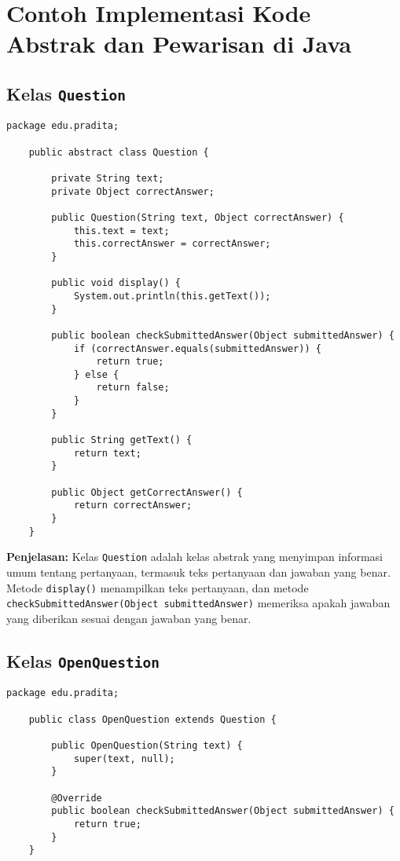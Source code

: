 \section{Contoh Implementasi Kode Abstrak dan Pewarisan di Java}

\subsection{Kelas \texttt{Question}}

\begin{lstlisting}[style=JavaStyle]
	package edu.pradita;
	
	public abstract class Question {
		
		private String text;
		private Object correctAnswer;
		
		public Question(String text, Object correctAnswer) {
			this.text = text;
			this.correctAnswer = correctAnswer;
		}
		
		public void display() {
			System.out.println(this.getText());
		}
		
		public boolean checkSubmittedAnswer(Object submittedAnswer) {
			if (correctAnswer.equals(submittedAnswer)) {
				return true;
			} else {
				return false;
			}
		}
		
		public String getText() {
			return text;
		}
		
		public Object getCorrectAnswer() {
			return correctAnswer;
		}
	}
\end{lstlisting}

\textbf{Penjelasan:} Kelas \texttt{Question} adalah kelas abstrak yang menyimpan informasi umum tentang pertanyaan, termasuk teks pertanyaan dan jawaban yang benar. Metode \texttt{display()} menampilkan teks pertanyaan, dan metode \texttt{checkSubmittedAnswer(Object submittedAnswer)} memeriksa apakah jawaban yang diberikan sesuai dengan jawaban yang benar.

\subsection{Kelas \texttt{OpenQuestion}}

\begin{lstlisting}[style=JavaStyle]
	package edu.pradita;
	
	public class OpenQuestion extends Question {
		
		public OpenQuestion(String text) {
			super(text, null);
		}
		
		@Override
		public boolean checkSubmittedAnswer(Object submittedAnswer) {
			return true;
		}
	}
\end{lstlisting}

